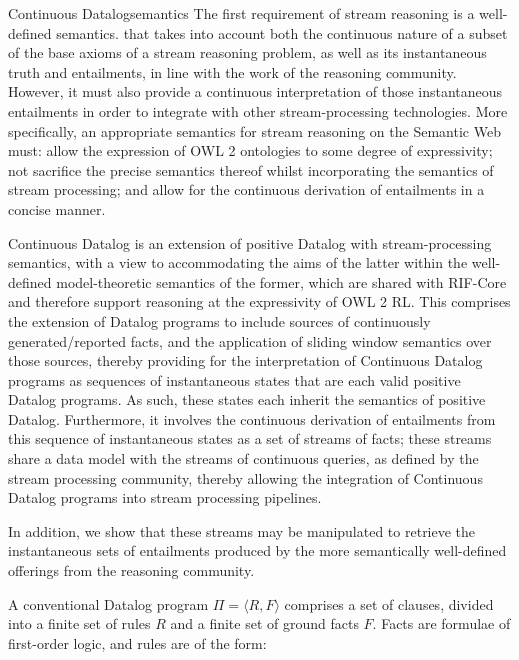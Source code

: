 \begin{nestedsection}{Continuous Datalog}{semantics}
The first requirement of stream reasoning is a well-defined semantics.
that takes into account both the continuous nature of a subset of the
base axioms of a stream reasoning problem, as well as its
instantaneous truth and entailments, in line with the work of the
reasoning community.  However, it must also provide a continuous
interpretation of those instantaneous entailments in order to
integrate with other stream-processing technologies.  More
specifically, an appropriate semantics for stream reasoning on the
Semantic Web must: allow the expression of OWL 2 ontologies to some
degree of expressivity; not sacrifice the precise semantics thereof
whilst incorporating the semantics of stream processing; and allow for
the continuous derivation of entailments in a concise manner.

Continuous Datalog is an extension of positive Datalog with
stream-processing semantics, with a view to accommodating the aims of
the latter within the well-defined model-theoretic semantics of the
former, which are shared with RIF-Core \cite{w3crifbld} and therefore
support reasoning at the expressivity of OWL 2 RL.  This comprises the
extension of Datalog programs to include sources of continuously
generated/reported facts, and the application of sliding window
semantics over those sources, thereby providing for the interpretation
of Continuous Datalog programs as sequences of instantaneous states
that are each valid positive Datalog programs.  As such, these states
each inherit the semantics of positive Datalog.  Furthermore, it
involves the continuous derivation of entailments from this sequence
of instantaneous states as a set of streams of facts; these streams
share a data model with the streams of continuous queries, as defined
by the stream processing community, thereby allowing the integration
of Continuous Datalog programs into stream processing pipelines.

In addition, we show that these streams may be manipulated to retrieve
the instantaneous sets of entailments produced by the more
semantically well-defined offerings from the reasoning community.


\begin{definition}[Datalog]

A conventional Datalog program $\Pi = \langle R, F\rangle$ comprises a
set of clauses, divided into a finite set of rules $R$ and a finite
set of ground facts $F$. Facts are formulae of first-order logic, and
rules are of the form:


\end{definition}
\end{nestedsection}
